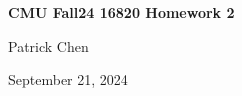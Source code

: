 \documentclass{article}
\begin{document}
	\begin{titlepage}
    	\vspace*{\fill} %
    	\begin{center}
        	{\huge \textbf{CMU Fall24 16820 Homework 2} \par}
       		\vspace{0.5cm}
        		{\large Patrick Chen \par}
        		\vspace{0.5cm}
        		{\large September 21, 2024 \par}
    	\end{center}
    	\vspace*{\fill} %
	\end{titlepage}
	
	\newpage
\end{document}
